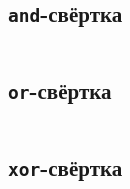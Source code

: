 \subsection{\texttt{and}-свёртка}
\begin{lstlisting}

\end{lstlisting}
\subsection{\texttt{or}-свёртка}
\begin{lstlisting}

\end{lstlisting}
\subsection{\texttt{xor}-свёртка}
\begin{lstlisting}

\end{lstlisting}
